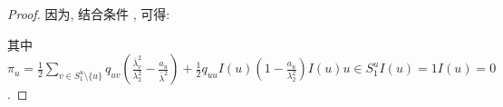 \begin{proof}
\begin{comment}
        \nonumber&=-c\mathrm{E}\Big\{\hat{x}^{\top}(t)[(L_u+\rho\beta I_N)\otimes \Gamma]\hat{{\delta}}(t)\Big\}\\
        \nonumber&\leq c\mathrm{E}\Big\{\|\hat{x}^{\top}(t)\|\|(L_u+\rho\beta I_N)\otimes \Gamma\|\|\hat{{\delta}}(t)\|\Big\}\\
        &\leq c\bar{\gamma}(\bar{\lambda}+\rho\beta)\mathrm{E}\Big\{\|\hat{x}^{\top}(t)\|\|\hat{{\delta}}(t)\|\Big\}.
        \end{comment}
        因为, 结合条件 , 可得:
        \begin{comment}\label{em}
        \nonumber&\quad\sum_{v=1}^{m}q_{uv}\mathrm{E}\Big\{e^\top(t)[L^2_{v}\otimes I_n]e(t)\Big\}\\
        \nonumber&=\sum_{v\in S_1^u}q_{uv}\mathrm{E}\Big\{e^\top(t)[(L^2_{v}-a_uI_N)\otimes I_n]e(t)\Big\}
        +\sum_{v\in S_2^u}q_{uv}\mathrm{E}\Big\{e^\top(t)[(L^2_{v}-a_uI_N)\otimes I_n]e(t)\Big\}\\
        \nonumber&\leq\sum_{v\in S_1^u\setminus\{u\}}q_{uv}\mathrm{E}\Big\{e^\top(t)[(L^2_{v}-a_uI_N)\otimes I_n]e(t)\Big\}
        +I(u)q_{uu}\mathrm{E}\Big\{e^\top(t)[(L^2_{u}-a_uI_N)\otimes I_n]e(t)\Big\}\\
        \nonumber&\leq\sum_{v\in S_1^u\setminus\{u\}}q_{uv}(\bar{\lambda}^2_{v}-a_u)\mathrm{E}\Big\{e^\top(t)e(t)\Big\}
        +I(u)q_{uu}\mathrm{E}\Big\{e^\top(t)[L^2_{u}\otimes I_n]e(t)\Big\}\\
        \nonumber&\quad-I(u)q_{uu}a_u\mathrm{E}\Big\{e^\top(t)e(t)\Big\}\\
        \nonumber&\leq\sum_{v\in S_1^u\setminus\{u\}}q_{uv}(\frac{\bar{\lambda}^2_{v}}{\lambda_2^{2}}-\frac{a_u}{\bar{\lambda}^{2}})\mathrm{E}\Big\{\hat{e}^\top(t)\hat{e}(t)\Big\}
        +q_{uu}I(u)(1-\frac{a_u}{\lambda_2^2})\mathrm{E}\Big\{\hat{e}^\top(t)\hat{e}(t)\Big\}\\
        &=2\pi_u\mathrm{E}\Big\{\hat{x}^\top(t)\hat{x}(t)\Big\},
        \end{comment}
        其中$\pi_u=\frac{1}{2}\sum_{v\in S_1^u\setminus\{u\}}q_{uv}(\frac{\bar{\lambda}^2_{v}}{\lambda_2^2}-\frac{a_u}{\bar{\lambda}^2})
        +\frac{1}{2}q_{uu}I(u)(1-\frac{a_u}{\lambda_2^2})I(u)u\in S_1^uI(u)=1I(u)=0$.


\end{proof}
